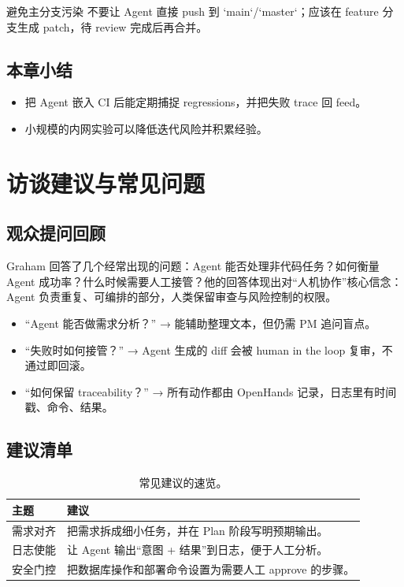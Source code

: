 \documentclass[a4paper]{article}
\begin{document}
\begin{warningbox}{避免主分支污染}
不要让 Agent 直接 push 到 `main`/`master`；应该在 feature 分支生成 patch，待 review 完成后再合并。
\end{warningbox}

\subsection{本章小结}
\begin{itemize}
    \item 把 Agent 嵌入 CI 后能定期捕捉 regressions，并把失败 trace 回 feed。
    \item 小规模的内网实验可以降低迭代风险并积累经验。
\end{itemize}

\section{访谈建议与常见问题}
\subsection{观众提问回顾}
Graham 回答了几个经常出现的问题：Agent 能否处理非代码任务？如何衡量 Agent 成功率？什么时候需要人工接管？他的回答体现出对“人机协作”核心信念：Agent 负责重复、可编排的部分，人类保留审查与风险控制的权限。

\begin{itemize}
    \item “Agent 能否做需求分析？” → 能辅助整理文本，但仍需 PM 追问盲点。
    \item “失败时如何接管？” → Agent 生成的 diff 会被 human in the loop 复审，不通过即回滚。
    \item “如何保留 traceability？” → 所有动作都由 OpenHands 记录，日志里有时间戳、命令、结果。
\end{itemize}

\subsection{建议清单}
\begin{table}[H]
\centering
\begin{tabular}{p{} p{}}
\toprule
主题 & 建议 \\
\midrule
需求对齐 & 把需求拆成细小任务，并在 Plan 阶段写明预期输出。 \\
\midrule
日志使能 & 让 Agent 输出“意图 + 结果”到日志，便于人工分析。 \\
\midrule
安全门控 & 把数据库操作和部署命令设置为需要人工 approve 的步骤。 \\
\bottomrule
\end{tabular}
\caption{常见建议的速览。}
\end{table}
\end{document}
